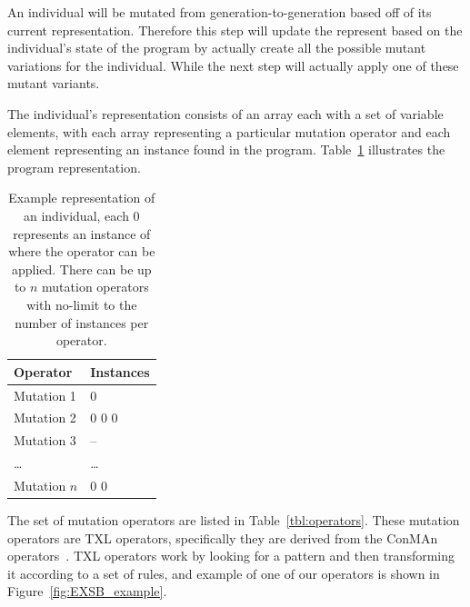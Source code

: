 \documentclass[10pt, conference, compsocconf]{IEEEtran}
\begin{document}
An individual will be mutated from generation-to-generation based off of its
current representation. Therefore this step will update the represent based on
the individual's state of the program by actually create all the possible
mutant variations for the individual. While the next step will actually apply
one of these mutant variants.

The individual's representation consists of an array each with a set of
variable elements, with each array representing a particular mutation operator
and each element representing an instance found in the program.
Table~\ref{tbl:individual_representation} illustrates the program
representation.

\begin{table}[!h]
\begin{center}
\begin{tabular}{|l|l|}
\hline
\textbf{Operator} &
\textbf{Instances}
\\\hline
Mutation 1 & 0
\\\hline
Mutation 2 & 0 0 0
\\\hline
Mutation 3 & --
\\\hline
\ldots & \ldots
\\\hline
Mutation $n$ & 0 0
\\\hline
\end{tabular}
\caption{Example representation of an individual, each 0 represents an instance
of where the operator can be applied. There can be up to $n$ mutation operators
with no-limit to the number of instances per operator.}
\label{tbl:individual_representation}
\end{center}
\end{table}

The set of mutation operators are listed in Table~\ref{tbl:operators}. These
mutation operators are TXL operators, specifically they are derived from the
ConMAn operators~\cite{BCD06}. TXL operators work by looking for a pattern and
then transforming it according to a set of rules, and example of one of our
operators is shown in Figure~\ref{fig:EXSB_example}.
\end{document}
